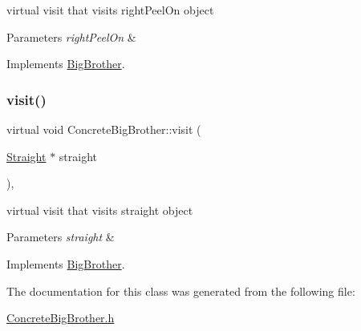 virtual visit that visits right\+Peel\+On object 
\begin{DoxyParams}{Parameters}
{\em right\+Peel\+On} & \\
\hline
\end{DoxyParams}


Implements \mbox{\hyperlink{class_big_brother_a4fbe48dafe53fe16647e0c4627ef178c}{Big\+Brother}}.

\mbox{\label{class_concrete_big_brother_a056169cb0e91f4ace1229d7caa2ee5d2}} 
\subsubsection{\texorpdfstring{visit()}{visit()}\hspace{0.1cm}{\footnotesize\ttfamily [7/7]}}
{\footnotesize\ttfamily virtual void Concrete\+Big\+Brother\+::visit (\begin{DoxyParamCaption}\item[{\mbox{\hyperlink{class_straight}{Straight}} $\ast$}]{straight }\end{DoxyParamCaption})\hspace{0.3cm}{\ttfamily [inline]}, {\ttfamily [virtual]}}

virtual visit that visits straight object 
\begin{DoxyParams}{Parameters}
{\em straight} & \\
\hline
\end{DoxyParams}


Implements \mbox{\hyperlink{class_big_brother_a16c919a7c2d90a111eb122210923bff2}{Big\+Brother}}.



The documentation for this class was generated from the following file\+:\begin{DoxyCompactItemize}
\item 
\mbox{\hyperlink{_concrete_big_brother_8h}{Concrete\+Big\+Brother.\+h}}\end{DoxyCompactItemize}
